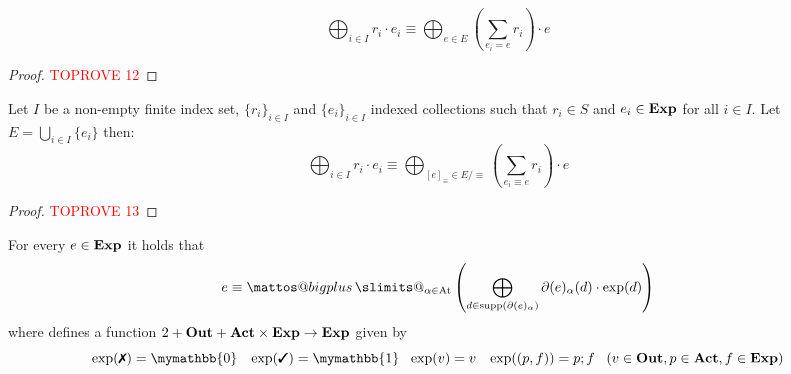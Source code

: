 \documentclass[a4paper,UKenglish,cleveref, autoref, thm-restate]{lipics-v2021}
\makeatletter
\newcommand{\cmark}{\text{\ding{51}}}
\newcommand{\xmark}{\text{\ding{55}}}
\newcommand{\Out}{\textbf{\upshape{Out}}}
\newcommand{\Act}{\textbf{\upshape{Act}}}
\newcommand{\At}{\text{\upshape{At}}}
\newcommand{\Exp}{\textbf{\upshape{Exp}}}
\newcommand{\ex}{\text{\upshape{exp}}}
\newcommand{\bskip}{\mymathbb{1}}
\newcommand{\babort}{\mymathbb{0}}
\theoremstyle{plain}\newtheoremrep{thm}{Theorem}[section]
\newcommand{\bigplus}{\DOTSB\mathop{\mathpalette\mattos@bigplus\relax}\slimits@
}
\newcommand\mattos@bigplus[2]{\vcenter{\hbox{\sbox\z@{$#1\sum$}\resizebox{!}{0.9\dimexpr\ht\z@+\dp\z@}{\raisebox{\depth}{$\m@th#1+$}}}}\vphantom{\sum}}
\makeatother
\begin{document}
\begin{toappendix}
\begin{lem}
			$$\bigoplus_{i \in I} r_i\cdot e_i \equiv \bigoplus_{e \in E}\left(\sum_{e_i=e}r_i\right)\cdot e$$ \label{lem63}
		\end{lem}
		\begin{proof}\textcolor{red}{TOPROVE 12}\end{proof}
		\begin{lem}
			Let $I$ be a non-empty finite index set, $\{r_i\}_{i \in I}$ and $\{e_i\}_{i \in I}$ indexed collections such that $r_i \in S$ and $e_i \in \Exp$ for all $i \in I$. Let $E = \bigcup_{i \in I}\{e_i\}$ then: 
			$$\bigoplus_{i\in I}r_i\cdot e_i \equiv \bigoplus_{[e]_\equiv \in E/\equiv}\left(\sum_{e_i \equiv e} r_i\right)\cdot e$$
			\label{lem64}
		\end{lem}
		\begin{proof}\textcolor{red}{TOPROVE 13}\end{proof}
	\end{toappendix}
	\begin{thmrep}
		For every $e \in \Exp$ it holds that $$e \equiv \bigplus_{\alpha \in \At} \left(\bigoplus_{d \in \text{supp}(\partial(e)_\alpha)}\partial(e)_\alpha(d) \cdot \ex(d)\right)$$
		where  defines a function $2+\Out+\Act\times\Exp \to \Exp$ given by
		$$\exp(\xmark) = \babort \;\;\;\exp(\cmark) = \bskip \;\;\;\ex(v) = v \;\;\;\exp((p, f)) = p;f \;\;\; (v \in \Out, p \in \Act, f \in \Exp)$$\label{fundamentaltheorem}
	\end{thmrep}
\end{document}
